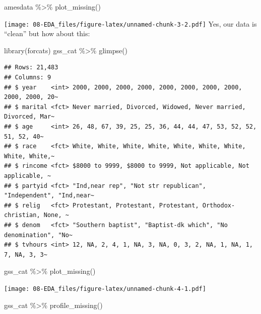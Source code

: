 \documentclass[
]{book}
\newenvironment{Shaded}{\begin{snugshade}}{\end{snugshade}}
\newcommand{\FunctionTok}[1]{\textcolor[rgb]{0.00,0.00,0.00}{#1}}
\newcommand{\NormalTok}[1]{#1}
\newcommand{\SpecialCharTok}[1]{\textcolor[rgb]{0.00,0.00,0.00}{#1}}
\begin{document}
\begin{Shaded}
\begin{Highlighting}[]
\NormalTok{amesdata }\SpecialCharTok{\%\textgreater{}\%} \FunctionTok{plot\_missing}\NormalTok{()}
\end{Highlighting}
\end{Shaded}

\texttt{[image: 08-EDA\_files/figure-latex/unnamed-chunk-3-2.pdf]}
Yes, our data is ``clean'' but how about this:

\begin{Shaded}
\begin{Highlighting}[]
\FunctionTok{library}\NormalTok{(forcats)}
\NormalTok{gss\_cat }\SpecialCharTok{\%\textgreater{}\%} \FunctionTok{glimpse}\NormalTok{()}
\end{Highlighting}
\end{Shaded}

\begin{verbatim}
## Rows: 21,483
## Columns: 9
## $ year    <int> 2000, 2000, 2000, 2000, 2000, 2000, 2000, 2000, 2000, 2000, 20~
## $ marital <fct> Never married, Divorced, Widowed, Never married, Divorced, Mar~
## $ age     <int> 26, 48, 67, 39, 25, 25, 36, 44, 44, 47, 53, 52, 52, 51, 52, 40~
## $ race    <fct> White, White, White, White, White, White, White, White, White,~
## $ rincome <fct> $8000 to 9999, $8000 to 9999, Not applicable, Not applicable, ~
## $ partyid <fct> "Ind,near rep", "Not str republican", "Independent", "Ind,near~
## $ relig   <fct> Protestant, Protestant, Protestant, Orthodox-christian, None, ~
## $ denom   <fct> "Southern baptist", "Baptist-dk which", "No denomination", "No~
## $ tvhours <int> 12, NA, 2, 4, 1, NA, 3, NA, 0, 3, 2, NA, 1, NA, 1, 7, NA, 3, 3~
\end{verbatim}

\begin{Shaded}
\begin{Highlighting}[]
\NormalTok{gss\_cat }\SpecialCharTok{\%\textgreater{}\%} \FunctionTok{plot\_missing}\NormalTok{()}
\end{Highlighting}
\end{Shaded}

\texttt{[image: 08-EDA\_files/figure-latex/unnamed-chunk-4-1.pdf]}

\begin{Shaded}
\begin{Highlighting}[]
\NormalTok{gss\_cat }\SpecialCharTok{\%\textgreater{}\%} \FunctionTok{profile\_missing}\NormalTok{()}
\end{Highlighting}
\end{Shaded}
\end{document}
